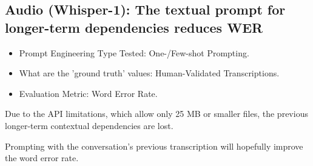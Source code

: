 \newpage
\subsection{Audio (Whisper-1): The textual prompt for longer-term dependencies reduces WER}

\begin{itemize}
    \item Prompt Engineering Type Tested: One-/Few-shot Prompting.
    \item What are the 'ground truth' values: Human-Validated Transcriptions.
    \item Evaluation Metric: Word Error Rate.
\end{itemize}
Due to the API limitations, which allow only 25 MB or smaller files, the previous longer-term contextual dependencies are lost. 



Prompting with the conversation's previous transcription will hopefully improve the word error rate. 


